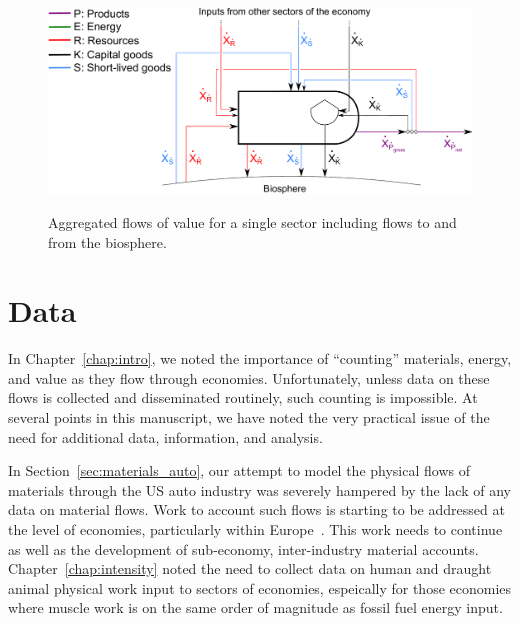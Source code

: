 
\begin{figure}[h!]
\centering\
\includegraphics[width=0.8\linewidth]{Part_3/Chapter_Unfinished/images/PERKS_basic_unit_value_with_biosphere_flows.pdf}
\caption[Aggregated flows of value for a single sector including flows to and from the biosphere]{Aggregated flows of value for a single sector including flows to and from the biosphere.}
\label{fig:basic_value_with_biosphere_flows}
\end{figure}


\section{Data}
\label{sec:Data}

In Chapter~\ref{chap:intro}, 
we noted the importance of ``counting''
materials, energy, and value as they flow through economies.  
Unfortunately, unless data on these flows 
is collected and disseminated routinely, 
such counting is impossible.
At several points in this manuscript,
we have noted the very practical issue of the
need for additional data, information, and analysis.

In Section~\ref{sec:materials_auto},
our attempt to model the physical flows of 
materials through the US auto industry was
severely hampered by the lack of any data on
material flows.
Work to account such flows is starting to be
addressed at the level of economies,
particularly within Europe~\cite{EUROSTAT2011}.
This work needs to continue as well as the
development of sub-economy,
inter-industry material accounts.
Chapter~\ref{chap:intensity} noted the need to collect
data on human and draught animal physical work input to 
sectors of economies, espeically for those economies where 
muscle work is on the same order of magnitude 
as fossil fuel energy input.

